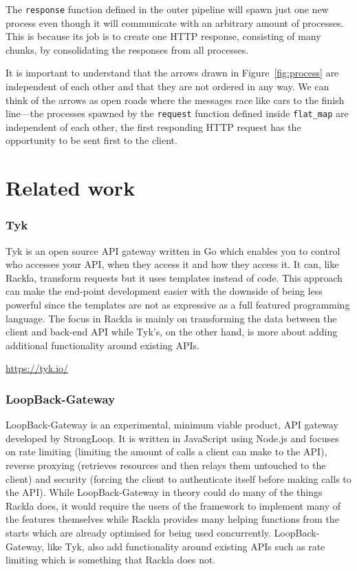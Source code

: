 \documentclass{cslthse-msc}
\begin{document}
The \lstinline{response} function defined in the outer pipeline will spawn just one new process even though it will communicate with an arbitrary amount of processes. This is because its job is to create one HTTP response, consisting of many chunks, by consolidating the responses from all processes.

It is important to understand that the arrows drawn in Figure~\ref{fig:process} are independent of each other and that they are not ordered in any way. We can think of the arrows as open roads where the messages race like cars to the finish line---the processes spawned by the \lstinline{request} function defined inside \lstinline{flat_map} are independent of each other, the first responding HTTP request has the opportunity to be sent first to the client.

\section{Related work}
\subsubsection{Tyk}

Tyk is an open source API gateway written in Go which enables you to control who accesses your API, when they access it and how they access it. It can, like Rackla, transform requests but it uses templates instead of code. This approach can make the end-point development easier with the downside of being less powerful since the templates are not as expressive as a full featured programming language. The focus in Rackla is mainly on transforming the data between the client and back-end API while Tyk's, on the other hand, is more about adding additional functionality around existing APIs.

\vspace{5mm}

\noindent \url{https://tyk.io/}

\subsubsection{LoopBack-Gateway}

LoopBack-Gateway is an experimental, minimum viable product, API gateway developed by StrongLoop. It is written in JavaScript using Node.js and focuses on rate limiting (limiting the amount of calls a client can make to the API), reverse proxying (retrieves resources and then relays them untouched to the client) and security (forcing the client to authenticate itself before making calls to the API). While LoopBack-Gateway in theory could do many of the things Rackla does, it would require the users of the framework to implement many of the features themselves while Rackla provides many helping functions from the starts which are already optimised for being used concurrently. LoopBack-Gateway, like Tyk, also add functionality around existing APIs such as rate limiting which is something that Rackla does not.
\end{document}
